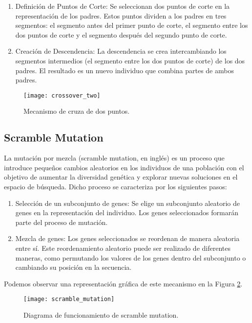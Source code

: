 \begin{enumerate}
	\item Definición de Puntos de Corte: Se seleccionan dos puntos de corte en la representación de los padres. Estos puntos dividen a los padres en tres segmentos: el segmento antes del primer punto de corte, el segmento entre los dos puntos de corte y el segmento después del segundo punto de corte.
	\item Creación de Descendencia: La descendencia se crea intercambiando los segmentos intermedios (el segmento entre los dos puntos de corte) de los dos padres. El resultado es un nuevo individuo que combina partes de ambos padres.
\end{enumerate}

\begin{figure}[htbp]
	\centering
	\texttt{[image: crossover\_two]}
	\caption{Mecanismo de cruza de dos puntos.}
	\label{fig: cross_two}
\end{figure}


\subsection{Scramble Mutation}
La mutación por mezcla (scramble mutation, en inglés) es un proceso que introduce pequeños cambios aleatorios en los individuos de una población con el objetivo de aumentar la diversidad genética y explorar nuevas soluciones en el espacio de búsqueda. Dicho proceso se caracteriza por los siguientes pasos:

\begin{enumerate}
	\item Selección de un subconjunto de genes: Se elige un subconjunto aleatorio de genes en la representación del individuo. Los genes seleccionados formarán parte del proceso de mutación.
	\item Mezcla de genes: Los genes seleccionados se reordenan de manera aleatoria entre sí. Este reordenamiento aleatorio puede ser realizado de diferentes maneras, como permutando los valores de los genes dentro del subconjunto o cambiando su posición en la secuencia.
\end{enumerate}

Podemos observar una representación gráfica de este mecanismo en la Figura \ref{fig:scrM}.

\begin{figure}[htbp]
	\centering
	\texttt{[image: scramble\_mutation]}
	\caption{Diagrama de funcionamiento de scramble mutation.}
	\label{fig:scrM}
\end{figure}


